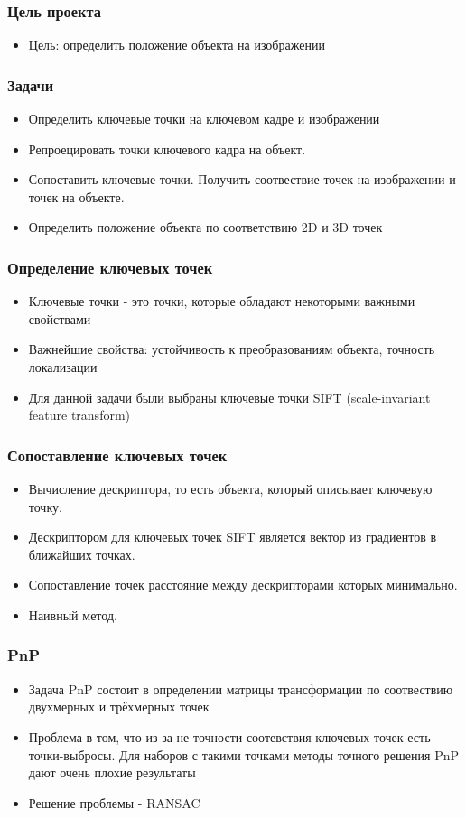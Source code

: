 \begin{frame}\frametitle{Цель проекта   }
    \begin{itemize}
        \item Цель: определить положение объекта на изображении
    \end{itemize}
\end{frame}
\begin{frame}\frametitle{Задачи}
    \begin{itemize}
        \item Определить ключевые точки на ключевом кадре и изображении
        \item Репроецировать точки ключевого кадра на объект.
        \item Сопоставить ключевые точки. Получить соотвествие 
            точек на изображении и точек на объекте.
        \item Определить положение объекта по соответствию 2D и 3D точек
    \end{itemize}
\end{frame}
\begin{frame}\frametitle{Определение ключевых точек}
    \begin{itemize}
        \item Ключевые точки - это точки, которые обладают некоторыми важными свойствами
        \item Важнейшие свойства: устойчивость к преобразованиям объекта, 
            точность локализации
        \item Для данной задачи были выбраны ключевые точки SIFT 
            (scale-invariant feature transform)
    \end{itemize}
\end{frame}
\begin{frame}\frametitle{Сопоставление ключевых точек}
    \begin{itemize}
        \item Вычисление дескриптора, то есть объекта, который описывает
            ключевую точку.
        \item Дескриптором для ключевых точек SIFT является вектор из 
            градиентов в ближайших точках.
        \item Сопоставление точек расстояние между дескрипторами которых 
            минимально.
        \item Наивный метод.
    \end{itemize}
\end{frame}
\begin{frame}\frametitle{PnP}
    \begin{itemize}
        \item Задача PnP состоит в определении матрицы трансформации по соотвествию двухмерных и трёхмерных точек
        \item Проблема в том, что из-за не точности соотевствия ключевых точек есть точки-выбросы. 
            Для наборов с такими точками методы точного решения PnP дают очень плохие результаты
        \item Решение проблемы - RANSAC
    \end{itemize}
\end{frame}
